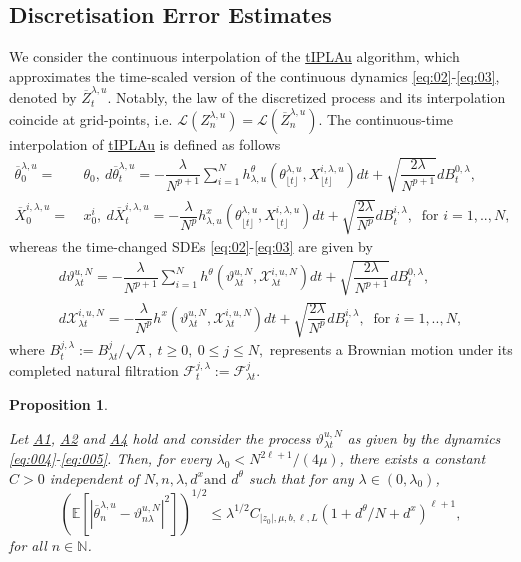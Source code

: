 \documentclass[a4paper, 10pt]{article}
\theoremstyle{plain}%
\newtheorem{proposition}{Proposition}%
\begin{document}
\subsection{Discretisation Error Estimates}
\noindent We consider the continuous interpolation of the \hyperref[algo1]{tIPLAu} algorithm, which approximates the time-scaled version of the continuous dynamics \eqref{eq:02}-\eqref{eq:03}, denoted by $\overline{{Z}}_t^{\lambda,u}$. Notably, the law of the discretized process and its interpolation coincide at grid-points, i.e. $\mathcal{L}({Z}_n^{\lambda,u})=\mathcal{L}(\overline{{Z}}_n^{\lambda,u})$. The continuous-time interpolation of \hyperref[algo1]{tIPLAu} is defined as follows
\begin{align}
\overline{\theta}_0^{\lambda,u}=&\ \theta_0,\ d\overline{\theta}_t^{\lambda,u}=-\dfrac{\lambda}{N^{p+1}}\sum_{i=1}^N h^{\theta}_{\lambda,u}(\theta_{\lfloor{t}\rfloor}^{\lambda,u},X^{i,\lambda,u}_{\lfloor{t}\rfloor})dt+\sqrt{\dfrac{{2\lambda}}{N^{p+1}}}dB_t^{0,\lambda},\label{eq:002}\\
\overline{X}_0^{i,\lambda,u}=&\ x^i_0,\ d\overline{X}_t^{i,\lambda,u}=-\dfrac{\lambda}{N^p}h^{x}_{\lambda,u}(\theta_{\lfloor{t}\rfloor}^{\lambda,u},X^{i,\lambda,u}_{\lfloor{t}\rfloor})dt+\sqrt{\dfrac{{2\lambda }}{N^p}}dB_t^{i,\lambda},\ \text{ for } i=1,..,N,\label{eq:003}
\end{align}
whereas the time-changed SDEs \eqref{eq:02}-\eqref{eq:03} are given by
\begin{gather}
d{\vartheta}_{\lambda t}^{u,N}=-\dfrac{\lambda}{N^{p+1}}\sum_{i=1}^N h^{\theta}({\vartheta}^{u,N}_{\lambda t},\mathcal{X}_{\lambda t}^{i,u,N})dt+\sqrt{\dfrac{2\lambda }{N^{p+1}}}dB_t^{0,\lambda},\label{eq:004}\\
d\mathcal{X}_{\lambda t}^{i,u,N}=-\dfrac{\lambda}{N^p} h^{x}({\vartheta}^{u,N}_{\lambda t},\mathcal{X}_{\lambda t}^{i,u,N})dt+\sqrt{\dfrac{2\lambda}{N^p} }dB_t^{i,\lambda},\ \text{ for } i=1,..,N,\label{eq:005}
\end{gather}
where $B_t^{j,\lambda}:=B_{\lambda t}^{j}/\sqrt{\lambda},\ t\geq 0,\ 0\leq j\leq N,$ represents a Brownian motion under its completed natural filtration $\mathcal{F}^{j,\lambda}_t:=\mathcal{F}^j_{\lambda t}.$\\ 
\par \noindent \begin{proposition}\hypertarget{Prop5}{}\label{Proposition5} Let \hyperlink{Assum1}{A1}, \hyperlink{Assum2}{A2} and \hyperlink{Assum4}{A4} hold and consider the process ${\vartheta}_{\lambda t}^{u,N}$ as given by the dynamics \eqref{eq:004}-\eqref{eq:005}. Then, for every $\lambda_0< N^{2\ell+1}/(4\mu)$, there exists a constant $C>0$ independent of $N,n,\lambda, d^x \text{and } d^{\theta}$ such that for any $\lambda\in(0,\lambda_0)$,
$$\left(\mathbb{E}\left[|\overline{\theta}^{\lambda,u}_n-\vartheta^{u,N}_{n\lambda}|^2\right]\right)^{1/2}\leq \lambda^{1/2} C_{|z_0|,\mu,b,\ell,L}{(1+d^{\theta}/N+d^x)}^{\ell+1},$$
for all $n\in\mathbb{N}$.\end{proposition}
\end{document}
